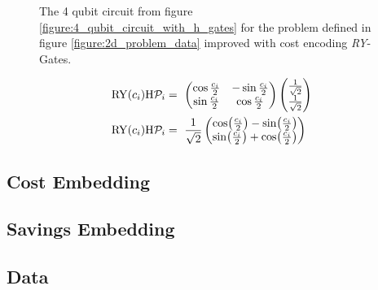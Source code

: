 \begin{figure}[!h]
    \centering
    \caption{The 4 qubit circuit from figure \ref{figure:4_qubit_circuit_with_h_gates} for the problem defined in figure \ref{figure:2d_problem_data} improved with cost encoding \emph{RY}-Gates.}
    \label{figure:4_qubit_circuit_with_h_ry_gates}
\end{figure}

\begin{equation}
    \centering
    \begin{split}
        \mathrm{RY}(c_i)\mathrm{H}\mathcal{P}_i &=\ \begin{pmatrix} \cos{\frac{c_i}{2}} & -\sin{\frac{c_i}{2}} \\ \sin{\frac{c_i}{2}} & \cos{\frac{c_i}{2}} \end{pmatrix}\begin{pmatrix}\frac{1}{\sqrt{2}} \\ \frac{1}{\sqrt{2}}\end{pmatrix}\\
        \mathrm{RY}(c_i)\mathrm{H}\mathcal{P}_i &=\ \frac{1}{\sqrt{2}}\begin{pmatrix}\cos(\frac{c_i}{2}) - \sin(\frac{c_i}{2}) \\ \sin(\frac{c_i}{2}) + \cos(\frac{c_i}{2})\end{pmatrix}\\
    \end{split}
    \label{equation:2d_problem_state_0_1}
\end{equation}


\subsection{Cost Embedding}
\subsection{Savings Embedding}
\subsection{Data}

\newpage
